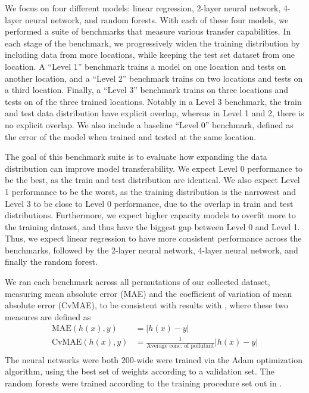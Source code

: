 \documentclass[journal abbreviation, manuscript]{copernicus}
\begin{document}
We focus on four different models: linear regression, 2-layer neural network, 4-layer neural network, and random forests. With each of these four models, we performed a suite of benchmarks that measure various transfer capabilities.
In each stage of the benchmark, we progressively widen the training distribution by including data from more locations, while keeping the test set dataset from one location.
A ``Level 1'' benchmark trains a model on one location and tests on another location, and a ``Level 2'' benchmark trains on two locations and tests on a third location. Finally, a ``Level 3'' benchmark trains on three locations and tests on of the three trained locations. Notably in a Level 3 benchmark, the train and test data distribution have explicit overlap, whereas in Level 1 and 2, there is no explicit overlap. 
We also include a baseline ``Level 0'' benchmark, defined as the error of the model when trained and tested at the same location. 

The goal of this benchmark suite is to evaluate how expanding the data distribution can improve model transferability. We expect Level 0 performance to be the best, as the train and test distribution are identical. We also expect Level 1 performance to be the worst, as the training distribution is the narrowest and Level 3 to be close to Level 0 performance, due to the overlap in train and test distributions. 
Furthermore, we expect higher capacity models to overfit more to the training dataset, and thus have the biggest gap between Level 0 and Level 1. Thus, we expect linear regression to have more consistent performance across the benchmarks, followed by the 2-layer neural network, 4-layer neural network, and finally the random forest.

We ran each benchmark across all permutations of our collected dataset,
measuring mean absolute error (MAE) and the coefficient of variation of mean absolute error (CvMAE), to be consistent with results with \citet{subu},
where these two measures are defined as
\begin{align*}
    \mathrm{MAE}(h(x), y) &= |h(x) - y| \\
    \mathrm{CvMAE}(h(x), y) &= \frac{1}{\textrm{Average conc. of pollutant}}|h(x) - y| \\
\end{align*}
The neural networks were both 200-wide were trained via the Adam optimization algorithm, using the best set of weights according to a validation set. The random forests were trained according to the training procedure set out in \citet{subu}.
\end{document}
